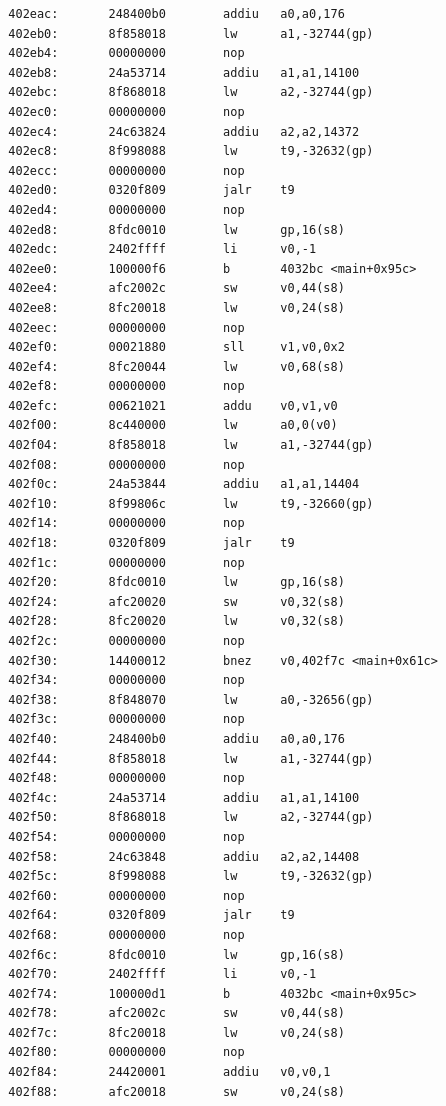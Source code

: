 \documentclass[11pt]{article}
\begin{document}
\begin{verbatim}
  402eac:       248400b0        addiu   a0,a0,176
  402eb0:       8f858018        lw      a1,-32744(gp)
  402eb4:       00000000        nop
  402eb8:       24a53714        addiu   a1,a1,14100
  402ebc:       8f868018        lw      a2,-32744(gp)
  402ec0:       00000000        nop
  402ec4:       24c63824        addiu   a2,a2,14372
  402ec8:       8f998088        lw      t9,-32632(gp)
  402ecc:       00000000        nop
  402ed0:       0320f809        jalr    t9
  402ed4:       00000000        nop
  402ed8:       8fdc0010        lw      gp,16(s8)
  402edc:       2402ffff        li      v0,-1
  402ee0:       100000f6        b       4032bc <main+0x95c>
  402ee4:       afc2002c        sw      v0,44(s8)
  402ee8:       8fc20018        lw      v0,24(s8)
  402eec:       00000000        nop
  402ef0:       00021880        sll     v1,v0,0x2
  402ef4:       8fc20044        lw      v0,68(s8)
  402ef8:       00000000        nop
  402efc:       00621021        addu    v0,v1,v0
  402f00:       8c440000        lw      a0,0(v0)
  402f04:       8f858018        lw      a1,-32744(gp)
  402f08:       00000000        nop
  402f0c:       24a53844        addiu   a1,a1,14404
  402f10:       8f99806c        lw      t9,-32660(gp)
  402f14:       00000000        nop
  402f18:       0320f809        jalr    t9
  402f1c:       00000000        nop
  402f20:       8fdc0010        lw      gp,16(s8)
  402f24:       afc20020        sw      v0,32(s8)
  402f28:       8fc20020        lw      v0,32(s8)
  402f2c:       00000000        nop
  402f30:       14400012        bnez    v0,402f7c <main+0x61c>
  402f34:       00000000        nop
  402f38:       8f848070        lw      a0,-32656(gp)
  402f3c:       00000000        nop
  402f40:       248400b0        addiu   a0,a0,176
  402f44:       8f858018        lw      a1,-32744(gp)
  402f48:       00000000        nop
  402f4c:       24a53714        addiu   a1,a1,14100
  402f50:       8f868018        lw      a2,-32744(gp)
  402f54:       00000000        nop
  402f58:       24c63848        addiu   a2,a2,14408
  402f5c:       8f998088        lw      t9,-32632(gp)
  402f60:       00000000        nop
  402f64:       0320f809        jalr    t9
  402f68:       00000000        nop
  402f6c:       8fdc0010        lw      gp,16(s8)
  402f70:       2402ffff        li      v0,-1
  402f74:       100000d1        b       4032bc <main+0x95c>
  402f78:       afc2002c        sw      v0,44(s8)
  402f7c:       8fc20018        lw      v0,24(s8)
  402f80:       00000000        nop
  402f84:       24420001        addiu   v0,v0,1
  402f88:       afc20018        sw      v0,24(s8)

\end{verbatim}
\end{document}

